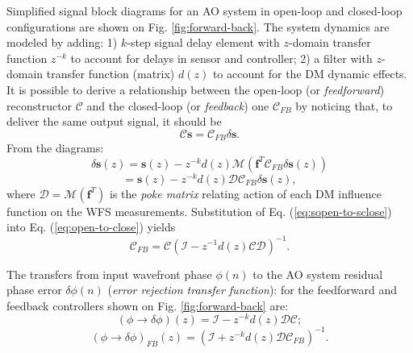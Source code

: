 Simplified signal block diagrams for an AO system in open-loop and closed-loop
configurations are shown on Fig. \ref{fig:forward-back}.
The system dynamics are modeled by adding: 1)
$k$-step signal delay element with $z$-domain transfer function $z^{-k}$ to
account for delays in sensor and controller; 2) a filter with $z$-domain
transfer function (matrix) $d(z)$ to account for the DM dynamic
effects. It is possible to derive a relationship between the open-loop (or
\emph{feedforward})
reconstructor $\mathcal{C}$ and the closed-loop (or \emph{feedback}) one
$\mathcal{C}_{FB}$ by noticing that, to deliver the same output signal, it
should be
\begin{equation} \label{eq:open-to-close}
  \mathcal{C} \bm{s} = \mathcal{C}_{FB} \delta \bm{s}.
\end{equation}
From the diagrams:
\begin{equation} \label{eq:sopen-to-sclose}
	\delta \bm{s}(z) = \bm{s}(z) - z^{-k} d(z) \mathcal{M} ( \bm{f}^{T}
	\mathcal{C}_{FB} \delta \bm{s}(z) )
\end{equation}
$$
  = \bm{s}(z) - z^{-k} d(z) \mathcal{DC}_{FB} \delta \bm{s}(z),
$$
where $\mathcal{D} = \mathcal{M} (\bm{f}^{T})$ is the \emph{poke matrix}
relating action of each DM influence function on the WFS measurements.
Substitution of Eq. (\ref{eq:sopen-to-sclose}) into Eq.
(\ref{eq:open-to-close}) yields
\begin{equation} \label{eq:fw-to-fb}
	\mathcal{C}_{FB} = \mathcal{C}
	( \mathcal{I} - z^{-1} d(z) \mathcal{CD} )^{-1}.
\end{equation}

The transfers from input wavefront phase $\phi(n)$ to the AO system
residual phase error $\delta \phi(n)$ (\emph{error rejection transfer
function}):  for the feedforward and
feedback controllers shown on Fig. \ref{fig:forward-back} are:
\begin{equation} \label{eq:forward-transfer}
	(\phi \rightarrow \delta \phi)(z) =
	\mathcal{I} -
	z^{-k} d(z) \mathcal{D} \mathcal{C};
\end{equation}
\begin{equation} \label{eq:feedback-transfer}
	(\phi \rightarrow \delta \phi)_{FB}(z) =
	( \mathcal{I}+z^{-k} d(z) \mathcal{D} \mathcal{C}_{FB} )^{-1}.
\end{equation}

